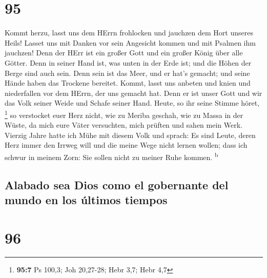 \hypertarget{section-94}{%
\section{95}\label{section-94}}

 Kommt herzu, lasst uns dem HErrn frohlocken und jauchzen
dem Hort unseres Heils!  Lasset uns mit Danken vor sein
Angesicht kommen und mit Psalmen ihm jauchzen!  Denn der
HErr ist ein großer Gott und ein großer König über alle Götter.
 Denn in seiner Hand ist, was unten in der Erde ist; und
die Höhen der Berge sind auch sein.  Denn sein ist das
Meer, und er hat's gemacht; und seine Hände haben das Trockene bereitet.
 Kommt, lasst uns anbeten und knien und niederfallen vor
dem HErrn, der uns gemacht hat.  Denn er ist unser Gott
und wir das Volk seiner Weide und Schafe seiner Hand. Heute, so ihr
seine Stimme höret, \footnote{\textbf{95:7} Ps 100,3; Joh 20,27-28; Hebr
  3,7; Hebr 4,7}  so verstocket euer Herz nicht, wie zu
Meriba geschah, wie zu Massa in der Wüste,  da mich eure
Väter versuchten, mich prüften und sahen mein Werk. 
Vierzig Jahre hatte ich Mühe mit diesem Volk und sprach: Es sind Leute,
deren Herz immer den Irrweg will und die meine Wege nicht lernen wollen;
 dass ich schwur in meinem Zorn: Sie sollen nicht zu
meiner Ruhe kommen. \textsuperscript{b}

\hypertarget{alabado-sea-dios-como-el-gobernante-del-mundo-en-los-uxfaltimos-tiempos}{%
\subsection{Alabado sea Dios como el gobernante del mundo en los últimos
tiempos}\label{alabado-sea-dios-como-el-gobernante-del-mundo-en-los-uxfaltimos-tiempos}}

\hypertarget{section-95}{%
\section{96}\label{section-95}}

